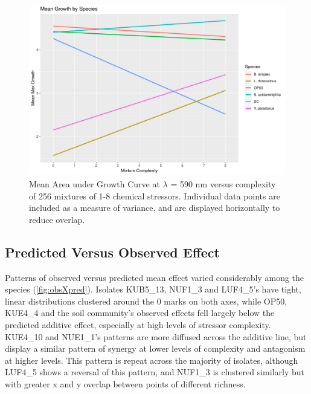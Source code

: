 \documentclass[final,1p,times]{elsarticle}
\begin{document}
\begin{figure}[H]
    \centering
    \includegraphics[width = \textwidth]{Scripts/Results/Final_Pipeline/growthXrichness.pdf}
    \caption{Mean Area under Growth Curve at $\lambda$ = 590 nm versus complexity of 256 mixtures of 1-8 chemical stressors. Individual data points are included as a measure of variance, and are displayed horizontally to reduce overlap.}
    \label{fig:growthXcomplex}
\end{figure}

\newpage
\subsection{Predicted Versus Observed Effect}
\label{S:3:5}

Patterns of observed versus predicted mean effect varied considerably among the species (\cref{fig:obsXpred}). Isolates KUB5\_13, NUF1\_3 and LUF4\_5’s have tight, linear distributions clustered around the 0 marks on both axes, while OP50, KUE4\_4 and the soil community’s observed effects fell largely below the predicted additive effect, especially at high levels of stressor complexity. KUE4\_10 and NUE1\_1’s patterns are more diffused across the additive line, but display a similar pattern of synergy at lower levels of complexity and antagonism at higher levels. This pattern is repeat across the majority of isolates, although LUF4\_5 shows a reversal of this pattern, and NUF1\_3 is clustered similarly but with greater x and y overlap between points of different richness.
\end{document}
